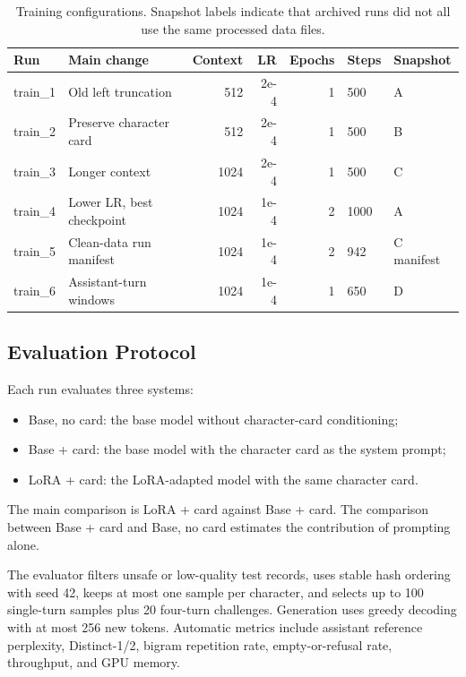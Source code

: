 \documentclass{article}
\newcommand{\base}{Base, no card\xspace}
\newcommand{\card}{Base + card\xspace}
\newcommand{\lora}{LoRA + card\xspace}
\begin{document}
\begin{table}[t]
  \centering
  \caption{Training configurations. Snapshot labels indicate that archived
  runs did not all use the same processed data files.}
  \label{tab:training-configs}
  \small
  \begin{tabular}{llrrrll}
    \toprule
    Run & Main change & Context & LR & Epochs & Steps & Snapshot \\
    \midrule
    train\_1 & Old left truncation & 512 & 2e-4 & 1 & 500 & A \\
    train\_2 & Preserve character card & 512 & 2e-4 & 1 & 500 & B \\
    train\_3 & Longer context & 1024 & 2e-4 & 1 & 500 & C \\
    train\_4 & Lower LR, best checkpoint & 1024 & 1e-4 & 2 & 1000 & A \\
    train\_5 & Clean-data run manifest & 1024 & 1e-4 & 2 & 942 & C manifest \\
    train\_6 & Assistant-turn windows & 1024 & 1e-4 & 1 & 650 & D \\
    \bottomrule
  \end{tabular}
\end{table}

\subsection{Evaluation Protocol}

Each run evaluates three systems:
\begin{itemize}
  \item \base: the base model without character-card conditioning;
  \item \card: the base model with the character card as the system prompt;
  \item \lora: the LoRA-adapted model with the same character card.
\end{itemize}
The main comparison is \lora against \card. The comparison between \card and
\base estimates the contribution of prompting alone.

The evaluator filters unsafe or low-quality test records, uses stable hash
ordering with seed 42, keeps at most one sample per character, and selects up
to 100 single-turn samples plus 20 four-turn challenges. Generation uses greedy
decoding with at most 256 new tokens. Automatic metrics include assistant
reference perplexity, Distinct-1/2, bigram repetition rate, empty-or-refusal
rate, throughput, and GPU memory.
\end{document}
